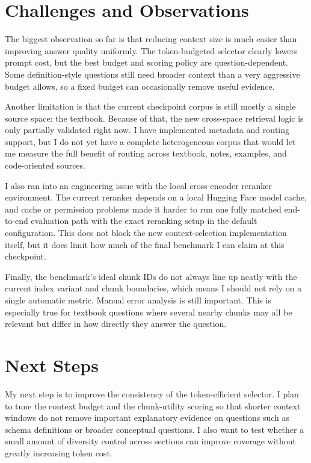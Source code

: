 \documentclass[10pt,twocolumn]{article}
\begin{document}
\section*{Challenges and Observations}
The biggest observation so far is that reducing context size is much easier than improving answer quality uniformly. The token-budgeted selector clearly lowers prompt cost, but the best budget and scoring policy are question-dependent. Some definition-style questions still need broader context than a very aggressive budget allows, so a fixed budget can occasionally remove useful evidence.

Another limitation is that the current checkpoint corpus is still mostly a single source space: the textbook. Because of that, the new cross-space retrieval logic is only partially validated right now. I have implemented metadata and routing support, but I do not yet have a complete heterogeneous corpus that would let me measure the full benefit of routing across textbook, notes, examples, and code-oriented sources.

I also ran into an engineering issue with the local cross-encoder reranker environment. The current reranker depends on a local Hugging Face model cache, and cache or permission problems made it harder to run one fully matched end-to-end evaluation path with the exact reranking setup in the default configuration. This does not block the new context-selection implementation itself, but it does limit how much of the final benchmark I can claim at this checkpoint.

Finally, the benchmark's ideal chunk IDs do not always line up neatly with the current index variant and chunk boundaries, which means I should not rely on a single automatic metric. Manual error analysis is still important. This is especially true for textbook questions where several nearby chunks may all be relevant but differ in how directly they answer the question.

\section*{Next Steps}
My next step is to improve the consistency of the token-efficient selector. I plan to tune the context budget and the chunk-utility scoring so that shorter context windows do not remove important explanatory evidence on questions such as schema definitions or broader conceptual questions. I also want to test whether a small amount of diversity control across sections can improve coverage without greatly increasing token cost.
\end{document}
